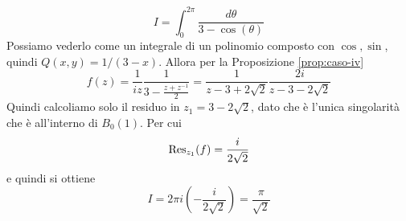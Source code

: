 \begin{example}
\begin{enumerate}
\begin{equation*}
        I = \int_{0}^{2\pi} \frac{d\theta}{3-\cos(\theta)}
      \end{equation*}
      Possiamo vederlo come un integrale di un polinomio composto con $\cos,
      \sin$, quindi $Q(x,y) = 1/(3-x)$. Allora per la Proposizione
      \ref{prop:caso-iv}
      \begin{equation*}
        f(z) = \frac{1}{iz} \frac{1}{3 - \frac{z+z^{-1}}{2}}
        = \frac{1}{z-3+2\sqrt{2}} \frac{2i}{z-3-2\sqrt{2}}
      \end{equation*}
      Quindi calcoliamo solo il residuo in $z_1 = 3-2\sqrt{2}$, 
      dato che è l'unica singolarità che è all'interno di $B_0(1)$. Per cui
      \begin{equation*}
        \operatorname{Res}_{z_1}(f) = \frac{i}{2\sqrt{2}}
      \end{equation*}
      e quindi si ottiene 
      \begin{equation*}
        I = 2\pi i \left( -\frac{i}{2\sqrt{2}} \right) = \frac{\pi}{\sqrt{2}}
      \end{equation*}
  \end{enumerate}
\end{example}
